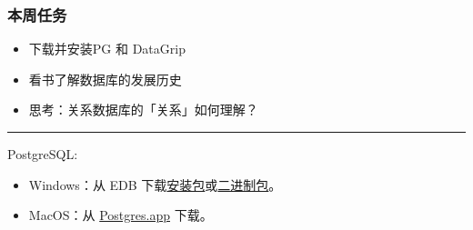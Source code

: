 \documentclass[aspectratio=169, 14pt]{beamer}
\begin{document}
\begin{frame}
	\frametitle{本周任务}
	\begin{itemize}
		\item 下载并安装PG 和 DataGrip
		\item 看书了解数据库的发展历史
		\item 思考：关系数据库的「关系」如何理解？
	\end{itemize}

	\noindent\rule{\textwidth}{1pt}

	PostgreSQL:

	\begin{itemize}
		\item {} Windows：从 EDB 下载\href{https://www.enterprisedb.com/downloads/postgres-postgresql-downloads}{安装包}或\href{https://www.enterprisedb.com/download-postgresql-binaries}{二进制包}。
		\item {} MacOS：从 \href{https://postgres.app/}{Postgres.app} 下载。
	\end{itemize}

\end{frame}
\end{document}
